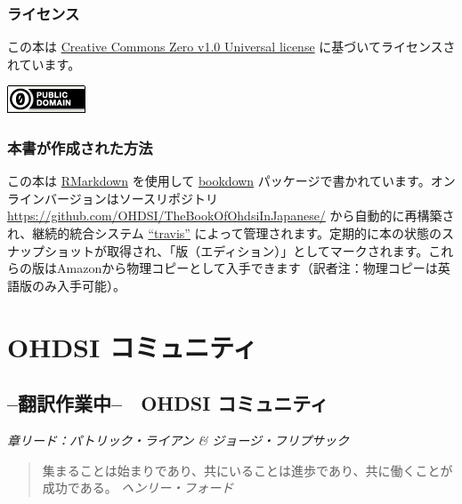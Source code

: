 \documentclass[
  11pt]{book}
\theoremstyle{definition}
\theoremstyle{definition}
\theoremstyle{definition}
\theoremstyle{definition}
\theoremstyle{remark}
\begin{document}
\section*{ライセンス}\label{ux30e9ux30a4ux30bbux30f3ux30b9}

この本は \href{http://creativecommons.org/publicdomain/zero/1.0/}{Creative Commons Zero v1.0 Universal license} に基づいてライセンスされています。

\includegraphics{images/Preface/cc0.png}

\section*{本書が作成された方法}\label{ux672cux66f8ux304cux4f5cux6210ux3055ux308cux305fux65b9ux6cd5}

この本は \href{https://rmarkdown.rstudio.com}{RMarkdown} を使用して \href{https://bookdown.org}{bookdown} パッケージで書かれています。オンラインバージョンはソースリポジトリ \url{https://github.com/OHDSI/TheBookOfOhdsiInJapanese/} から自動的に再構築され、継続的統合システム \href{http://travis-ci.org/}{``travis''} によって管理されます。定期的に本の状態のスナップショットが取得され、「版（エディション）」としてマークされます。これらの版はAmazonから物理コピーとして入手できます（訳者注：物理コピーは英語版のみ入手可能）。

\mainmatter

\part{OHDSI コミュニティ}\label{part-ohdsi-ux30b3ux30dfux30e5ux30cbux30c6ux30a3}

\chapter{--翻訳作業中--　OHDSI コミュニティ}\label{OhdsiCommunity}

\emph{章リード：パトリック・ライアン \& ジョージ・フリプサック}

\begin{quote}
集まることは始まりであり、共にいることは進歩であり、共に働くことが成功である。 \emph{ヘンリー・フォード}
\end{quote}
\end{document}
